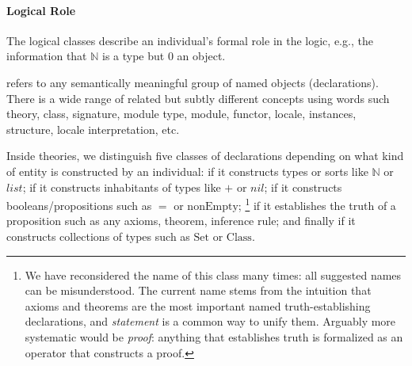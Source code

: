 \paragraph{Logical Role}
The logical classes describe an individual's formal role in the logic, e.g., the information that $\mathbb{N}$ is a type but $0$ an object.

 refers to any semantically meaningful group of named objects (declarations).
There is a wide range of related but subtly different concepts using words such theory, class, signature, module type, module, functor, locale, instances, structure, locale interpretation, etc.

\newcommand{\truthType}{\ind{predicate}\xspace}
\newcommand{\truthObject}{\ind{statement}\xspace}

Inside theories, we distinguish five classes of declarations depending on what kind of entity is constructed by an individual:
 if it constructs types or sorts like $\mathbb{N}$ or $list$;  if it constructs inhabitants of types like $+$ or $nil$; \truthType{\isabelle\coq} if it constructs booleans/propositions such as $=$ or $\mathrm{nonEmpty}$; \truthObject{\isabelle\coq}%
\footnote{We have reconsidered the name of this class many times: all suggested names can be misunderstood.
The current name stems from the intuition that axioms and theorems are the most important named truth-establishing declarations, and \emph{statement} is a common way to unify them.
Arguably more systematic would be \emph{proof}: anything that establishes truth is formalized as an operator that constructs a proof.}
if it establishes the truth of a proposition such as any axioms, theorem, inference rule; and finally  if it constructs collections of types such as $\mathrm{Set}$ or $\mathrm{Class}$.

